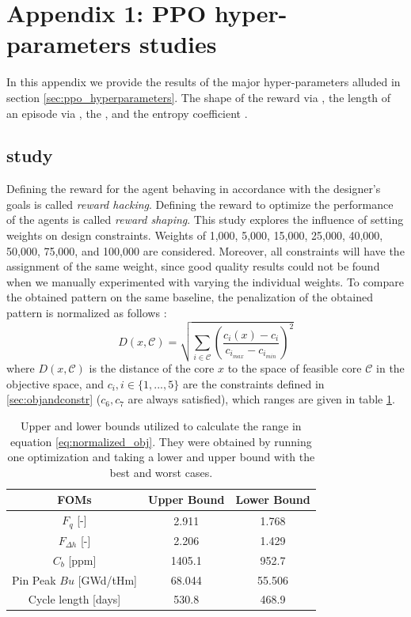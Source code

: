 \section{Appendix 1: PPO hyper-parameters studies}
\label{sec:ppohyperparameterstarts}
In this appendix we provide the results of the major hyper-parameters alluded in section \ref{sec:ppo_hyperparameters}. The shape of the reward via  , the length of an episode via  , the , and the entropy coefficient .
\subsection{ study}
\label{sec:weights_study}
Defining the reward for the agent behaving in accordance with the designer's goals is called  \textit{reward hacking}. Defining the reward to optimize the performance of the agents is called \textit{reward shaping}. This study explores the influence of setting weights on design constraints. Weights of 1,000, 5,000, 15,000, 25,000, 40,000, 50,000, 75,000, and 100,000 are considered. Moreover, all constraints will have the assignment of the same weight, since good quality results could not be found when we manually experimented with varying the individual weights. To compare the obtained pattern on the same baseline, the penalization of the obtained pattern is normalized as follows \cite{konak2006multiobjective}:
\begin{equation}
    D(x,\mathcal{C}) = \sqrt{\sum_{i \in \mathcal{C}}(\frac{c_i(x) - c_i}{c_{i_{max}} - c_{i_{min}}})^2}
    \label{eq:normalized_obj}
\end{equation}
where $D(x,\mathcal{C})$ is the distance of the core $x$ to the space of feasible core $\mathcal{C}$ in the objective space, and $c_i, i \in \{1,...,5\}$ are the constraints defined in \ref{sec:objandconstr} ($c_6,c_7$ are always satisfied), which ranges are given in table \ref{tab:rangevlues}. 
\begin{table}[H]
    \centering
    \caption{Upper and lower bounds utilized to calculate the range in equation \ref{eq:normalized_obj}. They were obtained by running one optimization and taking a lower and upper bound with the best and worst cases.}
    \begin{tabular}{c|c|c}
    \hline
    FOMs & Upper Bound & Lower Bound \\
    \hline
    $F_q$ [-] & 2.911 & 1.768 \\
    $F_{\Delta h}$ [-] & 2.206 & 1.429 \\
    $C_b$ [ppm] & 1405.1 & 952.7 \\ 
    Pin Peak $Bu$ [GWd/tHm] & 68.044 & 55.506 \\ 
    Cycle length [days] & 530.8 & 468.9   \\
         \hline
    \end{tabular}
    
    \label{tab:rangevlues}
\end{table}

